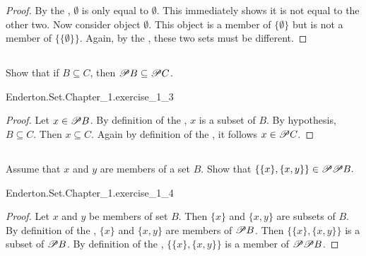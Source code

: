\documentclass{report}
\begin{document}
  \begin{proof}
    By the , $\emptyset$ is only equal to
      $\emptyset$.
    This immediately shows it is not equal to the other two.
    Now consider object $\emptyset$.
    This object is a member of $\{\emptyset\}$ but is not a member of
      $\{\{\emptyset\}\}$.
    Again, by the , these two sets must be
      different.
  \end{proof}

\subsection{}%

  Show that if $B \subseteq C$, then $\mathscr{P}B \subseteq \mathscr{P}C$.

    {Enderton.Set.Chapter\_1.exercise\_1\_3}

  \begin{proof}
    Let $x \in \mathscr{P}B$.
    By definition of the , $x$ is a subset of $B$.
    By hypothesis, $B \subseteq C$.
    Then $x \subseteq C$.
    Again by definition of the , it follows
      $x \in \mathscr{P}C$.
  \end{proof}

\subsection{}%

  Assume that $x$ and $y$ are members of a set $B$.
  Show that $\{\{x\}, \{x, y\}\} \in \mathscr{P}\mathscr{P}B.$

    {Enderton.Set.Chapter\_1.exercise\_1\_4}

  \begin{proof}
    Let $x$ and $y$ be members of set $B$.
    Then $\{x\}$ and $\{x, y\}$ are subsets of $B$.
    By definition of the , $\{x\}$ and $\{x, y\}$ are
      members of $\mathscr{P}B$.
    Then $\{\{x\}, \{x, y\}\}$ is a subset of $\mathscr{P}B$.
    By definition of the , $\{\{x\}, \{x, y\}\}$ is a
      member of $\mathscr{P}\mathscr{P}B$.
  \end{proof}

\subsection{}%
\end{document}
